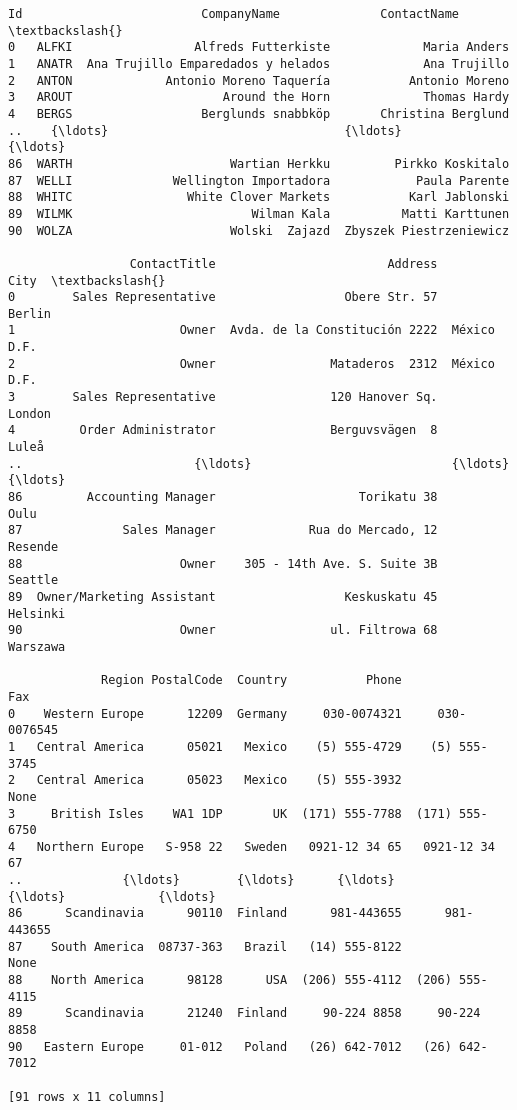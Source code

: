 \documentclass[11pt]{article}
\begin{document}
    \begin{Verbatim}[commandchars=\\\{\}]
       Id                         CompanyName              ContactName  \textbackslash{}
0   ALFKI                 Alfreds Futterkiste             Maria Anders
1   ANATR  Ana Trujillo Emparedados y helados             Ana Trujillo
2   ANTON             Antonio Moreno Taquería           Antonio Moreno
3   AROUT                     Around the Horn             Thomas Hardy
4   BERGS                  Berglunds snabbköp       Christina Berglund
..    {\ldots}                                 {\ldots}                      {\ldots}
86  WARTH                      Wartian Herkku         Pirkko Koskitalo
87  WELLI              Wellington Importadora            Paula Parente
88  WHITC                White Clover Markets           Karl Jablonski
89  WILMK                         Wilman Kala          Matti Karttunen
90  WOLZA                      Wolski  Zajazd  Zbyszek Piestrzeniewicz

                 ContactTitle                        Address         City  \textbackslash{}
0        Sales Representative                  Obere Str. 57       Berlin
1                       Owner  Avda. de la Constitución 2222  México D.F.
2                       Owner                Mataderos  2312  México D.F.
3        Sales Representative                120 Hanover Sq.       London
4         Order Administrator                Berguvsvägen  8        Luleå
..                        {\ldots}                            {\ldots}          {\ldots}
86         Accounting Manager                    Torikatu 38         Oulu
87              Sales Manager             Rua do Mercado, 12      Resende
88                      Owner    305 - 14th Ave. S. Suite 3B      Seattle
89  Owner/Marketing Assistant                  Keskuskatu 45     Helsinki
90                      Owner                ul. Filtrowa 68     Warszawa

             Region PostalCode  Country           Phone             Fax
0    Western Europe      12209  Germany     030-0074321     030-0076545
1   Central America      05021   Mexico    (5) 555-4729    (5) 555-3745
2   Central America      05023   Mexico    (5) 555-3932            None
3     British Isles    WA1 1DP       UK  (171) 555-7788  (171) 555-6750
4   Northern Europe   S-958 22   Sweden   0921-12 34 65   0921-12 34 67
..              {\ldots}        {\ldots}      {\ldots}             {\ldots}             {\ldots}
86      Scandinavia      90110  Finland      981-443655      981-443655
87    South America  08737-363   Brazil   (14) 555-8122            None
88    North America      98128      USA  (206) 555-4112  (206) 555-4115
89      Scandinavia      21240  Finland     90-224 8858     90-224 8858
90   Eastern Europe     01-012   Poland   (26) 642-7012   (26) 642-7012

[91 rows x 11 columns]
    \end{Verbatim}
\end{document}
